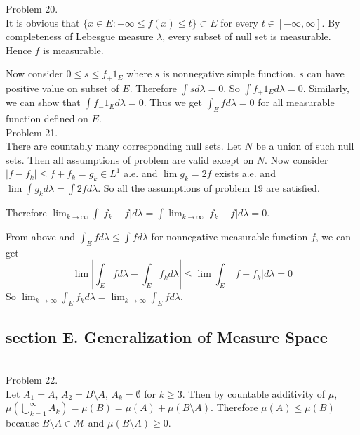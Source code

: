 Problem 20. \\

It is obvious that $\{ x \in E : - \infty \leq f(x) \leq t \} \subset E$ for every $t \in \left[ -\infty, \infty \right]$. By completeness of Lebesgue measure $\lambda$, every subset of null set is measurable. Hence $f$ is measurable.

Now consider $0 \leq s \leq f_{+}1_{E}$ where $s$ is nonnegative simple function. $s$ can have positive value on subset of $E$. Therefore $\int s d\lambda = 0$. So $\int f_{+} 1_{E} d\lambda  = 0$. Similarly, we can show that $\int f_{-} 1_{E} d\lambda = 0$. Thus we get $\int _{E} f d\lambda = 0 $ for all measurable function defined on $E$. \\

Problem 21. \\

There are countably many corresponding null sets. Let $N$ be a union of such null sets. Then all assumptions of problem are valid except on $N$.
Now consider $ \left | f - f_k  \right| \leq f + f_k = g_k \in L^1$ a.e. and $\lim g_k = 2f$ exists a.e. and $\lim \int g_k d\lambda = \int 2f d\lambda$. So all the assumptions of problem 19 are satisfied.

Therefore $\lim_{k\rightarrow \infty } \int \left | f_k - f  \right | d\lambda = \int \lim_{k\rightarrow \infty } \left| f_k - f  \right | d\lambda = 0$.

From above and $\int_{E} f d\lambda \leq \int f d\lambda $ for nonnegative measurable function $f$, we can get
\begin{equation*}
	\lim \left| \int_{E} f d\lambda - \int_{E} f_k d\lambda  \right | \leq \lim \int_{E} \left| f- f_k \right| d\lambda = 0
\end{equation*}
So $\lim_{k\rightarrow \infty}\int_{E}f_k d\lambda = \lim _{k\rightarrow \infty}\int_{E}f d\lambda$. \\

\subsection*{section E. Generalization of Measure Space} \hfill \\

Problem 22. \\

Let $A_1 = A$, $A_2 = B \setminus A$, $A_k = \emptyset$ for $k \geq 3$. Then by countable additivity of $\mu$,
$\mu\left( \bigcup_{k=1}^{\infty} A_k  \right) = \mu \left( B  \right) = \mu\left( A \right) + \mu\left( B\setminus A \right)$. Therefore $\mu\left( A \right) \leq \mu\left( B \right)$ because $B\setminus A \in \mathcal{M}$ and $\mu\left( B \setminus A \right) \geq 0$. \\

